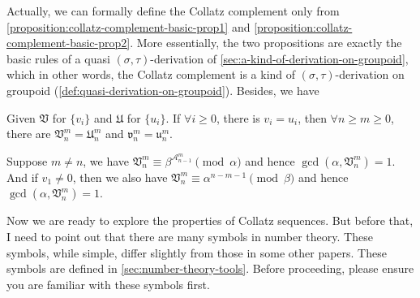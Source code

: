 Actually, we can formally define the Collatz complement only from \cref{proposition:collatz-complement-basic-prop1} and \cref{proposition:collatz-complement-basic-prop2}.
More essentially, the two propositions are exactly the basic rules of a quasi $(\sigma, \tau)$-derivation of \cref{sec:a-kind-of-derivation-on-groupoid}, which in other words, the Collatz complement is a kind of $(\sigma, \tau)$-derivation on groupoid (\cref{def:quasi-derivation-on-groupoid}). Besides, we have
\begin{proposition}[Uniqueness]\label{proposition:uniquess-of-Collatz-complement}
    Given $\mathfrak{V}$ for $\{v_i\}$ and $\mathfrak{U}$ for $\{u_i\}$. If $\forall i\ge 0$, there is $v_i = u_i$, then $\forall n \ge m \ge 0$, there are $\mathfrak{V}_n^{m} = \mathfrak{U}_n^{m}$ and $\mathfrak{v}_n^{m} = \mathfrak{u}_n^{m}$.
\end{proposition}
\begin{proposition}\label{prop:complement-coprime-with-alpha-and-beta}
    Suppose $m\ne n$, we have $\mathfrak{V}_n^{m} \equiv \beta^{\mathcal{A}_{n-1}^{m}} \pmod{\alpha}$ and hence $\gcd(\alpha, \mathfrak{V}_n^{m}) = 1$. And if $v_{1} \ne 0$, then we also have $\mathfrak{V}_n^{m} \equiv \alpha^{n-m-1} \pmod{\beta}$ and hence $\gcd(\alpha, \mathfrak{V}_n^{m}) = 1$.
\end{proposition}
Now we are ready to explore the properties of Collatz sequences.
But before that, I need to point out that there are many symbols in number theory.
These symbols, while simple, differ slightly from those in some other papers.
These symbols are defined in \cref{sec:number-theory-tools}. Before proceeding, please ensure you are familiar with these symbols first.
